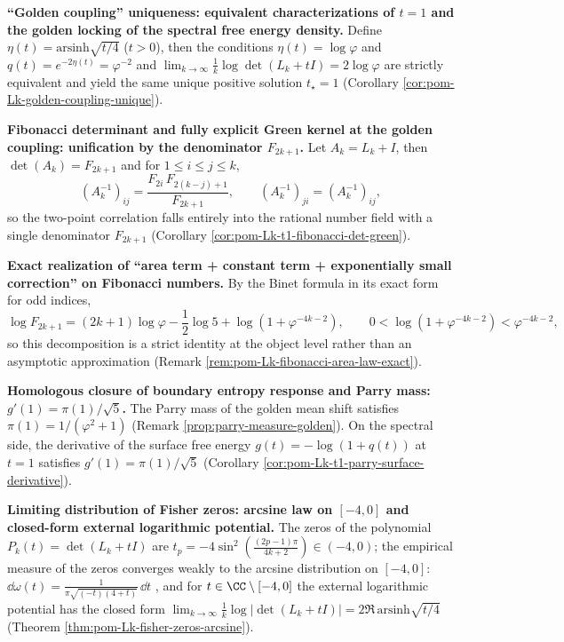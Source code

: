     \item \textbf{``Golden coupling'' uniqueness: equivalent characterizations of \texorpdfstring{\(t=1\)}{t=1} and the golden locking of the spectral free energy density.}
    Define \(\eta(t)=\mathrm{arsinh}\sqrt{t/4}\) (\(t>0\)), then the conditions
    \(
    \eta(t)=\log\varphi
    \)
    and
    \(
    q(t)=e^{-2\eta(t)}=\varphi^{-2}
    \)
    and
    \(
    \lim_{k\to\infty}\frac1k\log\det(L_k+tI)=2\log\varphi
    \)
    are strictly equivalent and yield the same unique positive solution \(t_\star=1\) (Corollary \ref{cor:pom-Lk-golden-coupling-unique}).

    \item \textbf{Fibonacci determinant and fully explicit Green kernel at the golden coupling: unification by the denominator \texorpdfstring{\(F_{2k+1}\)}{F_{2k+1}}.}
    Let \(A_k=L_k+I\), then
    \(
    \det(A_k)=F_{2k+1}
    \)
    and for \(1\le i\le j\le k\),
    \[
    (A_k^{-1})_{ij}=\frac{F_{2i}\,F_{2(k-j)+1}}{F_{2k+1}},
    \qquad (A_k^{-1})_{ji}=(A_k^{-1})_{ij},
    \]
    so the two-point correlation falls entirely into the rational number field with a single denominator \(F_{2k+1}\) (Corollary \ref{cor:pom-Lk-t1-fibonacci-det-green}).

    \item \textbf{Exact realization of ``area term + constant term + exponentially small correction'' on Fibonacci numbers.}
    By the Binet formula in its exact form for odd indices,
    \[
    \log F_{2k+1}=(2k+1)\log\varphi-\frac12\log 5+\log(1+\varphi^{-4k-2}),
    \qquad 0<\log(1+\varphi^{-4k-2})<\varphi^{-4k-2},
    \]
    so this decomposition is a strict identity at the object level rather than an asymptotic approximation (Remark \ref{rem:pom-Lk-fibonacci-area-law-exact}).

    \item \textbf{Homologous closure of boundary entropy response and Parry mass: \texorpdfstring{\(g'(1)=\pi(1)/\sqrt5\)}{g'(1)=pi(1)/sqrt5}.}
    The Parry mass of the golden mean shift satisfies
    \(
    \pi(1)=1/(\varphi^2+1)
    \)
    (Remark \ref{prop:parry-measure-golden}).
    On the spectral side, the derivative of the surface free energy \(g(t)=-\log(1+q(t))\) at \(t=1\) satisfies
    \(
    g'(1)=\pi(1)/\sqrt5
    \)
    (Corollary \ref{cor:pom-Lk-t1-parry-surface-derivative}).

    \item \textbf{Limiting distribution of Fisher zeros: arcsine law on \texorpdfstring{\([-4,0]\)}{[-4,0]} and closed-form external logarithmic potential.}
    The zeros of the polynomial \(P_k(t)=\det(L_k+tI)\) are
    \(
    t_p=-4\sin^2(\frac{(2p-1)\pi}{4k+2})\in(-4,0)
    \);
    the empirical measure of the zeros converges weakly to the arcsine distribution on \([-4,0]\):
    \(
    \dd\omega(t)=\frac{1}{\pi\sqrt{(-t)(4+t)}}\,\dd t
    \)
    , and for \(t\in\CC\setminus[-4,0]\) the external logarithmic potential has the closed form
    \(
    \lim_{k\to\infty}\frac1k\log|\det(L_k+tI)|=2\Re\,\mathrm{arsinh}\sqrt{t/4}
    \)
    (Theorem \ref{thm:pom-Lk-fisher-zeros-arcsine}).

